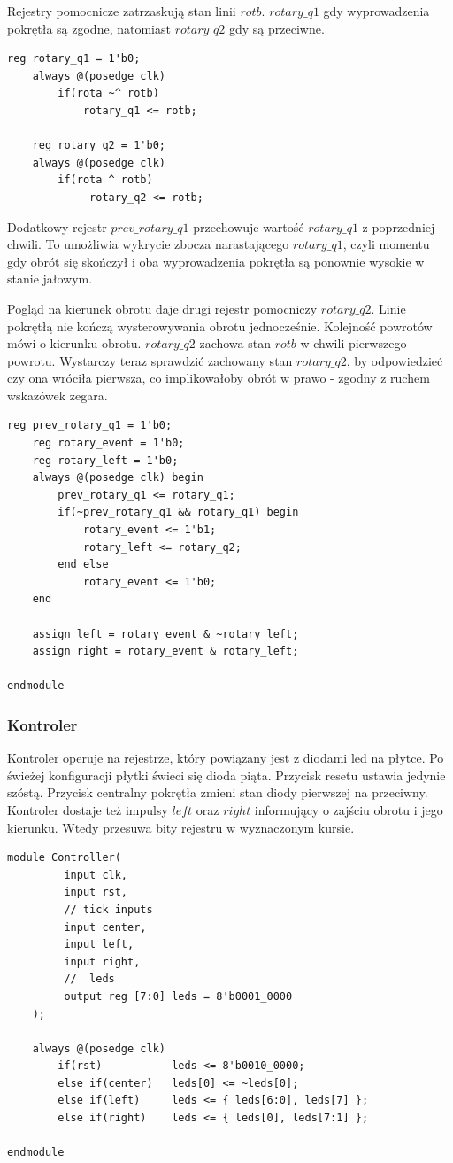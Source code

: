 \documentclass[a4paper,12pt]{article}
\begin{document}
Rejestry pomocnicze zatrzaskują stan linii $rotb$. $rotary\_q1$ gdy wyprowadzenia pokrętła są zgodne, natomiast $rotary\_q2$ gdy są przeciwne.
\begin{lstlisting}[label=Rotor,caption=Rotor.v,firstnumber=12]
    reg rotary_q1 = 1'b0;
    always @(posedge clk)
        if(rota ~^ rotb)
            rotary_q1 <= rotb;

    reg rotary_q2 = 1'b0;
    always @(posedge clk)
        if(rota ^ rotb)
             rotary_q2 <= rotb;
\end{lstlisting}

Dodatkowy rejestr $prev\_rotary\_q1$ przechowuje wartość $rotary\_q1$ z poprzedniej chwili. To umożliwia wykrycie zbocza narastającego $rotary\_q1$, czyli momentu gdy obrót się skończył i oba wyprowadzenia pokrętła są ponownie wysokie w stanie jałowym.

Pogląd na kierunek obrotu daje drugi rejestr pomocniczy $rotary\_q2$. Linie pokrętłą nie kończą wysterowywania obrotu jednocześnie. Kolejność powrotów mówi o kierunku obrotu. $rotary\_q2$ zachowa stan $rotb$ w chwili pierwszego powrotu. Wystarczy teraz sprawdzić zachowany stan $rotary\_q2$, by odpowiedzieć czy ona wróciła pierwsza, co implikowałoby obrót w prawo - zgodny z ruchem wskazówek zegara.
\begin{lstlisting}[label=Rotor,caption=Rotor.v,firstnumber=22]
    reg prev_rotary_q1 = 1'b0;
    reg rotary_event = 1'b0;
    reg rotary_left = 1'b0;
    always @(posedge clk) begin
        prev_rotary_q1 <= rotary_q1;
        if(~prev_rotary_q1 && rotary_q1) begin
            rotary_event <= 1'b1;
            rotary_left <= rotary_q2;
        end else
            rotary_event <= 1'b0;
    end

    assign left = rotary_event & ~rotary_left;
    assign right = rotary_event & rotary_left;

endmodule
\end{lstlisting}

\subsubsection{Kontroler}

Kontroler operuje na rejestrze, który powiązany jest z diodami led na płytce. Po świeżej konfiguracji płytki świeci się dioda piąta. Przycisk resetu ustawia jedynie szóstą. Przycisk centralny pokrętła zmieni stan diody pierwszej na przeciwny. Kontroler dostaje też impulsy $left$ oraz $right$ informujący o zajściu obrotu i jego kierunku. Wtedy przesuwa bity rejestru w wyznaczonym kursie.
\begin{lstlisting}[label=Controller,caption=Controller.v]
module Controller(
         input clk,
         input rst,
         // tick inputs
         input center,
         input left,
         input right,
         //  leds
         output reg [7:0] leds = 8'b0001_0000
    );

    always @(posedge clk)
        if(rst)           leds <= 8'b0010_0000;
        else if(center)   leds[0] <= ~leds[0];
        else if(left)     leds <= { leds[6:0], leds[7] };
        else if(right)    leds <= { leds[0], leds[7:1] };

endmodule
\end{lstlisting}
\end{document}
